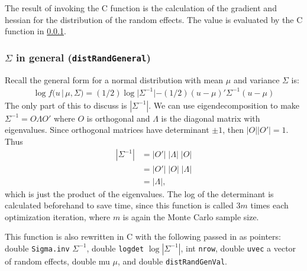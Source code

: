 \documentclass{article}
\begin{document}
The result of invoking the C function is  the calculation of the gradient and hessian for the distribution of the random effects. The value is  evaluated by the C function in \ref{sec:Dgeneral}.

\subsubsection{$\Sigma$ in general (\texttt{distRandGeneral})}\label{sec:Dgeneral}
 Recall the general form for a normal distribution with mean $\mu$ and variance $\Sigma$ is:
\begin{align}
\log f(u \,| \,\mu, \Sigma) = (1/2) \log |\Sigma^{-1}| - (1/2) (u-\mu)' \Sigma^{-1} (u-\mu)
\end{align}
 The only part of this to discuss is $|\Sigma^{-1}|$. We can use eigendecomposition to make $\Sigma^{-1}=O \Lambda O'$ where $O$ is orthogonal and $\Lambda$ is the diagonal matrix with eigenvalues. Since orthogonal matrices have determinant $\pm 1$, then $|O||O'|=1$. Thus  
\begin{align}
|\Sigma^{-1}|&=|O'| \; |\Lambda| \; |O| \\
&= |O'| \; |O| \; |\Lambda| \\
&=|\Lambda|,
\end{align}
which is just the product of the eigenvalues. The log of the determinant is calculated beforehand to save time, since this function is called $3m$ times each optimization iteration, where $m$ is again the Monte Carlo sample size.

This function is also rewritten in C with the following  passed in as pointers: double \texttt{Sigma.inv} $\Sigma^{-1}$, double \texttt{logdet} $\log |\Sigma^{-1}|$, int \texttt{nrow}, double \texttt{uvec} a vector of random effects, double {mu} $\mu$, and double \texttt{distRandGenVal}.
\end{document}
